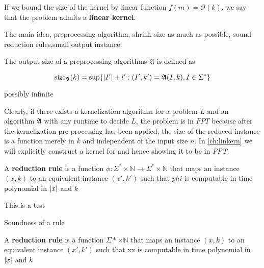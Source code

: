 If we bound the size of the kernel by linear function $f(m) = \mathcal{O}(k)$, we say that the problem admits a \textbf{linear kernel}. 


The main idea, preprocessing algorithm, shrink size as much as possible, sound reduction rules,small output instance

\begin{definition} The output size of a preprocessing algorithms $\mathfrak{A}$ is defined as 

    \[\mathrm{size}_{\mathfrak{A}}(k) = \sup\{\abs{I'} + l': (I',k')= \mathfrak{A}(I,k), I \in \Sigma^* \} \]
\end{definition}

possibly infinite

Clearly, if there exists a kernelization algorithm for a problem $L$ and an algorithm $\mathfrak{A}$ with any runtime to decide $L$, the problem is in $FPT$ because after the kernelization pre-processing has been applied, the size of the reduced instance is a function merely in $k$ and independent of the input size $n$. In \cref{ch:linkern} we will explicitly construct a kernel for \psdom and hence showing it to be in \textit{FPT}. 


\begin{definition}
A \textbf{reduction rule} is a function $\phi:\Sigma^* \times \mathbb{N} \rightarrow \Sigma^* \times \mathbb{N}$ that maps an instance $(x,k)$ to an equivalent instance $(x',k')$ such that $phi$ is computable in time polynomial in $\abs{x}$ and $k$
\end{definition}

\begin{definition}
     This is a test
\end{definition}

\begin{definition}{Soundness of a rule}

\end{definition}

A \textbf{reduction rule} is a function $\Sigma* \times \mathbb{N}$ that maps an instance $(x,k)$ to an equivalent instance $(x',k')$ such that xx is computable in time polynomial in $\abs{x}$ and $k$

